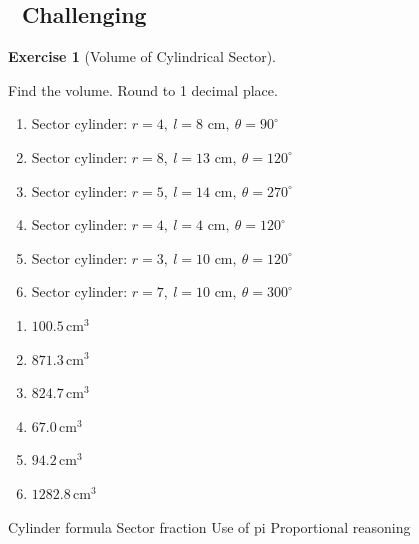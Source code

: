 \documentclass[
  letterpaper,
  DIV=11,
  numbers=noendperiod]{scrreprt}
\theoremstyle{definition}
\newtheorem{exercise}{Exercise}[chapter]
\theoremstyle{remark}
\begin{document}
\subsection{🔴 Challenging}

\begin{exercise}[Volume of Cylindrical
Sector]\protect\hypertarget{exr-vol-10}{}\label{exr-vol-10}

Find the volume. Round to 1 decimal place.

\begin{enumerate}
\def\labelenumi{\alph{enumi})}
\item
  \(\text{Sector cylinder: }r=4,\ l=8\text{ cm},\ \theta=90^\circ\)
\item
  \(\text{Sector cylinder: }r=8,\ l=13\text{ cm},\ \theta=120^\circ\)
\item
  \(\text{Sector cylinder: }r=5,\ l=14\text{ cm},\ \theta=270^\circ\)
\item
  \(\text{Sector cylinder: }r=4,\ l=4\text{ cm},\ \theta=120^\circ\)
\item
  \(\text{Sector cylinder: }r=3,\ l=10\text{ cm},\ \theta=120^\circ\)
\item
  \(\text{Sector cylinder: }r=7,\ l=10\text{ cm},\ \theta=300^\circ\)
\end{enumerate}

\begin{tcolorbox}[enhanced jigsaw, opacitybacktitle=0.6, coltitle=black, arc=.35mm, colframe=quarto-callout-tip-color-frame, colback=white, bottomrule=.15mm, left=2mm, colbacktitle=quarto-callout-tip-color!10!white, titlerule=0mm, opacityback=0, title=\textcolor{quarto-callout-tip-color}{\faLightbulb}\hspace{0.5em}{🔍 View Solution}, leftrule=.75mm, breakable, rightrule=.15mm, bottomtitle=1mm, toptitle=1mm, toprule=.15mm]

\begin{enumerate}
\def\labelenumi{\alph{enumi})}
\item
  \(100.5\,\text{cm}^{3}\)
\item
  \(871.3\,\text{cm}^{3}\)
\item
  \(824.7\,\text{cm}^{3}\)
\item
  \(67.0\,\text{cm}^{3}\)
\item
  \(94.2\,\text{cm}^{3}\)
\item
  \(1282.8\,\text{cm}^{3}\)
\end{enumerate}

\end{tcolorbox}

{Cylinder formula} {Sector fraction} {Use of pi} {Proportional
reasoning}

\end{exercise}
\end{document}

